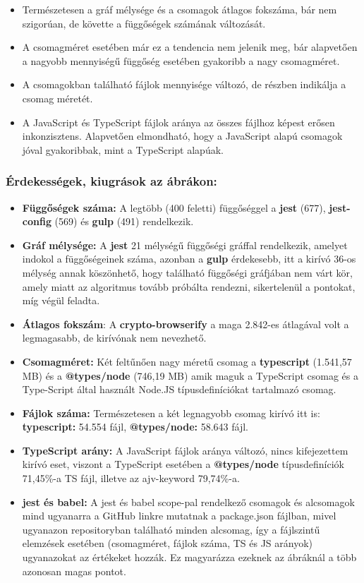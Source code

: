 \begin{itemize}
	\item Természetesen a gráf mélysége és a csomagok átlagos fokszáma, bár nem szigorúan, de követte a függőségek számának változását.
	\item A csomagméret esetében már ez a tendencia nem jelenik meg, bár alapvetően a nagyobb mennyiségű függőség esetében gyakoribb a nagy csomagméret.
	\item A csomagokban található fájlok mennyisége változó, de részben indikálja a csomag méretét.
	\item A JavaScript és TypeScript fájlok aránya az összes fájlhoz képest erősen inkonzisztens. Alapvetően elmondható, hogy a JavaScript alapú csomagok jóval gyakoribbak, mint a TypeScript alapúak.
\end{itemize}

\subsubsection{Érdekességek, kiugrások az ábrákon:}

\begin{itemize}
	\item \textbf{Függőségek száma:} A legtöbb (400 feletti) függőséggel a \textbf{jest} (677), \textbf{jest-config} (569) és \textbf{gulp} (491) rendelkezik.
	\item \textbf{Gráf mélysége:} A \textbf{jest} 21 mélységű függőségi gráffal rendelkezik, amelyet indokol a függőségeinek száma, azonban a \textbf{gulp} érdekesebb, itt a kirívó 36-os mélység annak köszönhető, hogy található függőségi gráfjában nem várt kör, amely miatt az algoritmus tovább próbálta rendezni, sikertelenül a pontokat, míg végül feladta.
	\item \textbf{Átlagos fokszám}:  A \textbf{crypto-browserify} a maga 2.842-es átlagával volt a legmagasabb, de kirívónak nem nevezhető.
	\item \textbf{Csomagméret:} Két feltűnően nagy méretű csomag a \textbf{typescript} (1.541,57 MB) és a \textbf{@types/node} (746,19 MB) amik maguk a TypeScript csomag és a Type-Script által használt Node.JS típusdefiníciókat tartalmazó csomag.
	\item \textbf{Fájlok száma:} Természetesen a két legnagyobb csomag kirívó itt is: \textbf{typescript:} 54.554 fájl, \textbf{@types/node:} 58.643 fájl.
	\item \textbf{TypeScript arány:} A JavaScript fájlok aránya változó, nincs kifejezettem kirívó eset, viszont a TypeScript esetében a \textbf{@types/node} típusdefiníciók 71,45\%-a TS fájl, illetve az ajv-keyword 79,74\%-a.
	\item \textbf{jest és babel: }A jest és babel scope-pal rendelkező csomagok és alcsomagok mind ugyanarra a GitHub linkre mutatnak a package.json fájlban, mivel ugyanazon repositoryban található minden alcsomag, így a fájlszintű elemzések esetében (csomagméret, fájlok száma, TS és JS arányok) ugyanazokat az értékeket hozzák. Ez magyarázza ezeknek az ábráknál a több azonosan magas pontot.
	
\end{itemize}


